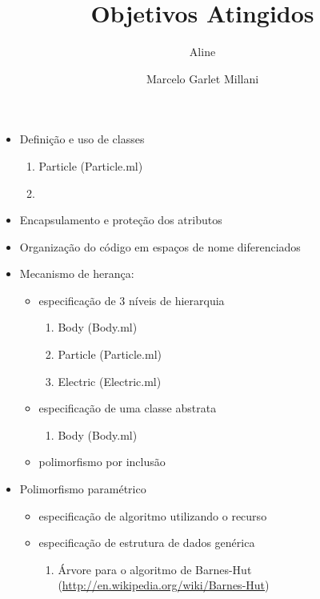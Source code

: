 \documentclass[a4paper,10pt]{article}
\title{Objetivos Atingidos}
\author{Aline \and Marcelo Garlet Millani}
\begin{document}
\maketitle

\section{}

\begin{itemize}
 \item Definição e uso de classes
		{\color{notDone}
		\begin{enumerate}
			\item Particle (Particle.ml)
			\item 
		\end{enumerate}
		}
 \item Encapsulamento e proteção dos atributos
 \item Organização do código em espaços de nome diferenciados
 \item Mecanismo de herança:
	\begin{itemize}
	 \item especificação de 3 níveis de hierarquia
		{\color{notDone}
		\begin{enumerate}
			\item Body (Body.ml)
			\item Particle (Particle.ml)
			\item Electric (Electric.ml)
		\end{enumerate}
		}
	 \item especificação de uma classe abstrata
		{\color{notDone}
		\begin{enumerate}
			\item Body (Body.ml)
		\end{enumerate}
		}
	 \item polimorfismo por inclusão
	\end{itemize}
 \item Polimorfismo paramétrico
	\begin{itemize}
	 \item especificação de algoritmo utilizando o recurso
	 \item especificação de estrutura de dados genérica
	 {\color{notDone}
		\begin{enumerate}
			\item Árvore para o algoritmo de Barnes-Hut (\url{http://en.wikipedia.org/wiki/Barnes-Hut})
		\end{enumerate}
		}
	\end{itemize}

\end{itemize}
\end{document}
